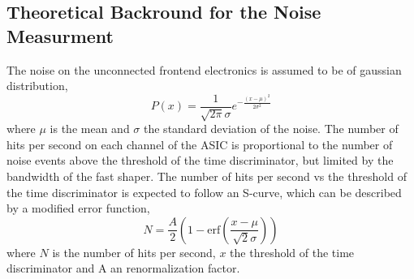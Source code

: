 \subsection{Theoretical Backround for the Noise Measurment} \label{sec:noise_theory}
The noise on the unconnected frontend electronics is assumed to be of gaussian distribution,
\begin{equation}
    P(x) = \frac{1}{\sqrt{2\pi}\sigma}e^{-\frac{(x-\mu)^2}{2\sigma^2}}
\end{equation}
where $\mu$ is the mean and $\sigma$ the standard deviation of the noise.\autocite{Theorynoise}
\newline
The number of hits per second on each channel of the ASIC is proportional to the number of noise events above the threshold of the time discriminator, but limited by the bandwidth of the fast shaper.\autocite{Theorynoise}
\newline
The number of hits per second vs the threshold of the time discriminator is expected to follow an S-curve, which can be described by a modified error function,
\begin{equation}
    N = \frac{A}{2} \left( 1 - \text{erf} \left( \frac{x - \mu}{\sqrt{2}\sigma} \right) \right)
\end{equation}
where $N$ is the number of hits per second, $x$ the threshold of the time discriminator and A an renormalization factor.\autocite{Theorynoise}